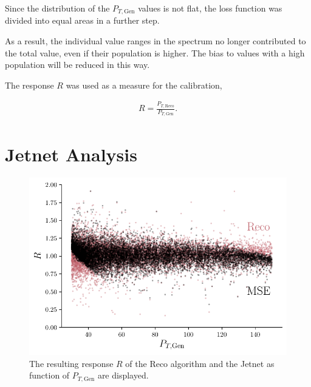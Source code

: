 \documentclass[12pt, a4paper]{thesis}
\begin{document}

Since the distribution of the \(P_{T, \text{Gen}}\) values is not
flat, the loss function was divided into equal areas in a further
step.

 As a result, the individual
value ranges in the spectrum no longer contributed to the total value,
even if their population is higher. The bias to values with a high
population will be reduced in this way.

The response \(R\) was used as a measure for the calibration,

\begin{align}
R = \frac{P_{T, \text{Reco}}}{P_{T, \text{Gen}}}.
\end{align}

\section{Jetnet Analysis}
\label{sec:org03235a3}


\begin{figure}[H]
  \centering
  \includegraphics[width=.9\linewidth]{../images/jetnet_R_scatter.pdf}
  \caption{The resulting response \(R\) of the Reco algorithm and the
    Jetnet as function of \(P_{T, \text{Gen}}\) are
    displayed. }
  \label{jetnet_R_scatter}
\end{figure}
\end{document}
